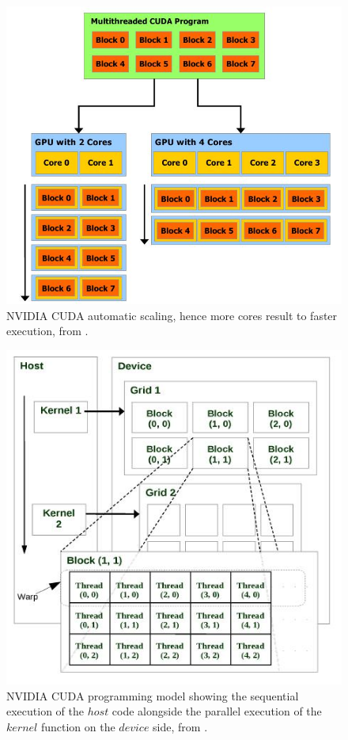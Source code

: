 \documentclass{acm_proc_article-sp}
\begin{document}
	\begin{figure}
		\centering
		\includegraphics[scale=.5]{cuda-scaling.jpeg} 
		\caption{NVIDIA CUDA automatic scaling, hence more cores
result to faster execution, from \cite{cudaguide}.}
		\label{cuda_scale}
	\end{figure}
	
	\begin{figure}
		\centering
		\includegraphics[scale=.6]{cuda-model.jpeg} 
		\caption{NVIDIA CUDA programming model showing the sequential execution of the $host$ code alongside the parallel execution of the $kernel$ function on the $device$ side, from \cite{sat}.}
		\label{cuda_model}
	\end{figure}
\end{document}
